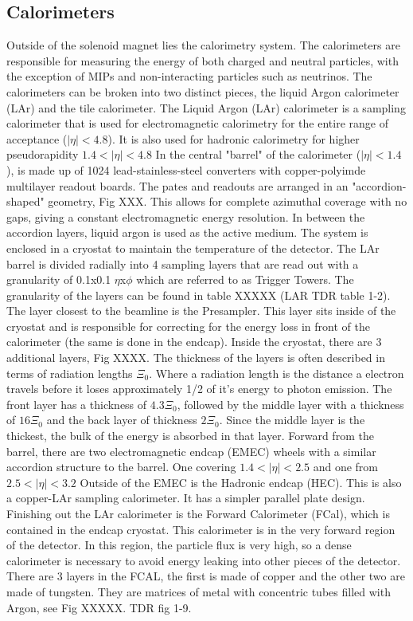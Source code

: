 \subsection{Calorimeters}\label{ssec:calo}
Outside of the solenoid magnet lies the calorimetry system. The calorimeters are responsible for measuring the energy of both charged and neutral particles, with the exception of MIPs and non-interacting particles such as neutrinos. The calorimeters can be broken into two distinct pieces, the liquid Argon calorimeter (LAr) and the tile calorimeter. \linebreak
\indent The Liquid Argon (LAr) calorimeter is a sampling calorimeter that is used for electromagnetic calorimetry for the entire range of acceptance (${|\eta{}|<4.8}$). It is also used for hadronic calorimetry for higher pseudorapidity ${1.4<|\eta{}|<4.8}$ In the central "barrel" of the calorimeter (${|\eta{}| < 1.4}$), is made up of 1024 lead-stainless-steel converters with copper-polyimde multilayer readout boards. The pates and readouts are arranged in an "accordion-shaped" geometry, Fig XXX. This allows for complete azimuthal coverage with no gaps, giving a constant electromagnetic energy resolution. In between the accordion layers, liquid argon is used as the active medium. The system is enclosed in a cryostat to maintain the temperature of the detector. The LAr barrel is divided radially into 4 sampling layers that are read out with a granularity of 0.1x0.1 ${\eta}$x${\phi}$ which are referred to as Trigger Towers. The granularity of the layers can be found in table XXXXX (LAR TDR table 1-2). The layer closest to the beamline is the Presampler. This layer sits inside of the cryostat and is responsible for  correcting for the energy loss in front of the calorimeter (the same is done in the endcap). Inside the cryostat, there are 3 additional layers, Fig XXXX. The thickness of the layers is often described in terms of radiation lengths ${\Xi_{0}}$. Where a radiation length is the distance a electron travels before it loses approximately 1/2 of it's energy to photon emission.  The front layer has a thickness of ${4.3\Xi_{0}}$, followed by the middle layer with a thickness of ${16\Xi_{0}}$ and the back layer of thickness ${2\Xi_{0}}$. Since the middle layer is the thickest, the bulk of the energy is absorbed in that layer. \linebreak 
\indent Forward from the barrel, there are two electromagnetic endcap (EMEC) wheels with a similar accordion structure to the barrel. One covering ${1.4 < |\eta{}| < 2.5}$ and one from ${2.5 < |\eta{}| < 3.2}$ Outside of the EMEC is the Hadronic endcap (HEC). This is also a copper-LAr sampling calorimeter. It has a simpler parallel plate design. Finishing out the LAr calorimeter is the Forward Calorimeter (FCal), which is contained in the endcap cryostat. This calorimeter is in the very forward region of the detector. In this region, the particle flux is very high, so a dense calorimeter is necessary to avoid energy leaking into other pieces of the detector. There are 3 layers in the FCAL, the first is made of copper and the other two are made of tungsten. They are matrices of metal with concentric tubes filled with Argon, see Fig XXXXX. TDR fig 1-9. \linebreak
